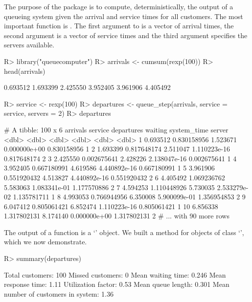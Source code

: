 \documentclass[article]{jss}
\begin{document}
The purpose of the package  is to compute, deterministically, the output of a queueing system given the arrival and service times for all customers. The most important function is . The first argument to   is a vector of arrival times, the second argument is a vector of service times and the third argument specifies the servers available. 
%
\begin{CodeChunk}
\begin{Sinput}
R> library("queuecomputer")
R> arrivals <- cumsum(rexp(100))
R> head(arrivals)
\end{Sinput}
\begin{Soutput}
[1] 0.693512 1.693399 2.425550 3.952405 3.961906 4.405492
\end{Soutput}
\begin{Sinput}
R> service <- rexp(100)
R> departures <- queue_step(arrivals, service = service, servers = 2)
R> departures
\end{Sinput}
\begin{Soutput}
# A tibble: 100 x 6
   arrivals     service departures      waiting system_time server
      <dbl>       <dbl>      <dbl>        <dbl>       <dbl>  <dbl>
1  0.693512 0.830158956   1.523671 0.000000e+00 0.830158956      1
2  1.693399 0.817648174   2.511047 1.110223e-16 0.817648174      2
3  2.425550 0.002675641   2.428226 2.138047e-16 0.002675641      1
4  3.952405 0.667180991   4.619586 4.440892e-16 0.667180991      1
5  3.961906 0.551920432   4.513827 4.440892e-16 0.551920432      2
6  4.405492 1.069236762   5.583063 1.083341e-01 1.177570886      2
7  4.594253 1.110448926   5.730035 2.533279e-02 1.135781711      1
8  4.993053 0.766944956   6.350008 5.900099e-01 1.356954853      2
9  6.047412 0.805061421   6.852474 1.110223e-16 0.805061421      1
10 6.856338 1.317802131   8.174140 0.000000e+00 1.317802131      2
# ... with 90 more rows
\end{Soutput}
\end{CodeChunk}
%
The output of a  function is a `'
object. We built a  method for objects of class
`', which we now demonstrate.
%
\begin{CodeChunk}
\begin{Sinput}
R> summary(departures)
\end{Sinput}
\begin{Soutput}
Total customers:
 100
Missed customers:
 0
Mean waiting time:
 0.246
Mean response time:
 1.11
Utilization factor:
 0.53
Mean queue length:
 0.301
Mean number of customers in system:
 1.36
\end{Soutput}
\end{CodeChunk}
\end{document}

